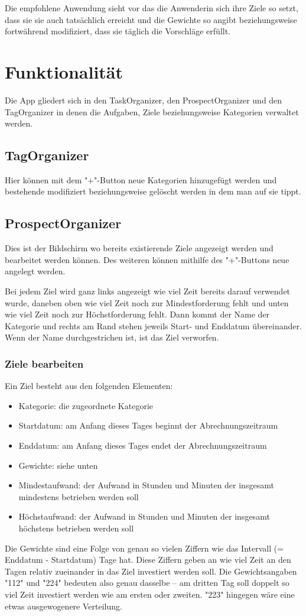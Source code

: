 \documentclass[10pt,a4paper]{article}
\begin{document}
Die empfohlene Anwendung sieht vor das die Anwenderin sich ihre Ziele so setzt, dass sie sie auch tatsächlich erreicht und die Gewichte so angibt beziehungsweise fortwährend modifiziert, dass sie täglich die Vorschläge erfüllt.

\section{Funktionalität}
Die App gliedert sich in den TaskOrganizer, den ProspectOrganizer und den TagOrganizer in denen die Aufgaben, Ziele beziehungsweise Kategorien verwaltet werden.

\subsection{TagOrganizer}
Hier können mit dem "+"-Button neue Kategorien hinzugefügt werden und bestehende modifiziert beziehungsweise gelöscht werden in dem man auf sie tippt.

\subsection{ProspectOrganizer}
Dies ist der Bildschirm wo bereits existierende Ziele angezeigt werden und bearbeitet werden können. Des weiteren können mithilfe des "+"-Buttons neue angelegt werden.

Bei jedem Ziel wird ganz links angezeigt wie viel Zeit bereits darauf verwendet wurde, daneben oben wie viel Zeit noch zur Mindestforderung fehlt und unten wie viel Zeit noch zur Höchstforderung fehlt. Dann kommt der Name der Kategorie und rechts am Rand stehen jeweils Start- und Enddatum übereinander.
Wenn der Name durchgestrichen ist, ist das Ziel verworfen.
\subsubsection{Ziele bearbeiten}
Ein Ziel besteht aus den folgenden Elementen:
\begin{itemize}
	\item \textsf{Kategorie:} die zugeordnete Kategorie
	\item \textsf{Startdatum:} am Anfang dieses Tages beginnt der Abrechnungszeitraum
	\item \textsf{Enddatum:} am Anfang dieses Tages endet der Abrechnungszeitraum 
	\item \textsf{Gewichte:} siehe unten
	\item \textsf{Mindestaufwand:} der Aufwand in Stunden und Minuten der insgesamt mindestens betrieben werden soll
	\item \textsf{Höchstaufwand:} der Aufwand in Stunden und Minuten der insgesamt höchstens betrieben werden soll
\end{itemize}
Die Gewichte sind eine Folge von \textsf{genau} so vielen Ziffern wie das Intervall (= Enddatum - Startdatum) Tage hat. Diese Ziffern geben an wie viel Zeit an den Tagen relativ zueinander in das Ziel investiert werden soll. Die Gewichtsangaben "112" und "224" bedeuten also genau dasselbe – am dritten Tag soll doppelt so viel Zeit investiert werden wie am ersten oder zweiten. "223" hingegen wäre eine etwas ausgewogenere Verteilung.
\end{document}
